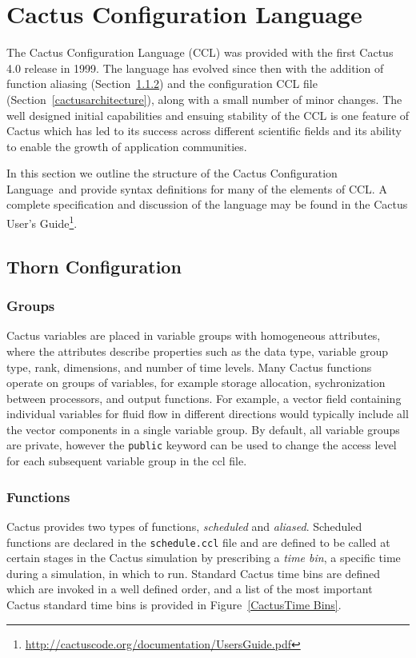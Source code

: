 \documentclass[conference]{IEEEtran}
\newcommand{\ccl}{Cactus Configuration Language}
\begin{document}
\section{Cactus Configuration Language}
\label{CCL}

The Cactus Configuration Language (CCL) was provided with the first Cactus 4.0 release in 1999. 
The language has evolved since then with the addition of function aliasing (Section~\ref{cactusfunctions}) and the configuration CCL file (Section~\ref{cactusarchitecture}), along with a small number of minor changes.
The well designed initial capabilities and ensuing stability of the CCL is one feature of Cactus which 
has led to its success across different scientific fields and its ability to enable the growth of application communities.

In this section we outline the structure of the \ccl\ and provide syntax definitions for many of the
elements of CCL\@. A complete specification and discussion of the language may be found in the 
Cactus User's Guide\footnote{\url{http://cactuscode.org/documentation/UsersGuide.pdf}}.

\subsection{Thorn Configuration}
\subsubsection{Groups}

Cactus variables are placed in variable groups with homogeneous attributes,
where the attributes describe properties such as the data type, variable group
type, rank, dimensions, and number of time levels. 
Many Cactus functions operate on groups of variables, for example storage allocation, sychronization between processors, and output
functions.
For example, a vector field containing individual variables for fluid flow in different directions would typically include all the vector components in 
a single variable group. 
By default, all variable groups are private,
however the {\tt public} keyword can be used to change the access level for each subsequent variable group in the ccl file.

\subsubsection{Functions}
\label{cactusfunctions}
Cactus provides two types of functions, \emph{scheduled} and \emph{aliased}. Scheduled
functions are declared in the \texttt{schedule.ccl} file and are defined to be called at certain stages
in the Cactus simulation by prescribing a {\it time bin}, a specific time during a simulation,
in which to run. Standard Cactus time bins are defined 
which are invoked in a well defined order, and a list of 
 the most important Cactus standard time bins is provided in Figure~\ref{CactusTime Bins}. 
\end{document}

